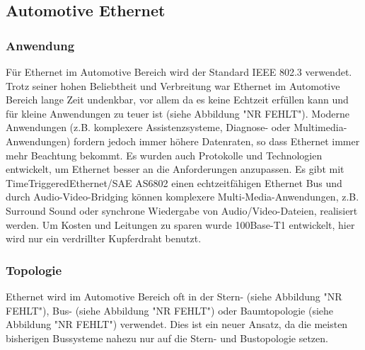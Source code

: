     \graphicspath{{./Images/Kapitel4/}}
    
    \subsection{Automotive Ethernet}
    \subsubsection{Anwendung}
    Für Ethernet im Automotive Bereich wird der Standard IEEE 802.3 verwendet. Trotz seiner hohen Beliebtheit und Verbreitung war Ethernet im Automotive Bereich lange Zeit undenkbar, vor allem da es keine Echtzeit erfüllen kann und für kleine Anwendungen zu teuer ist (siehe Abbildung "NR FEHLT"). Moderne Anwendungen (z.B. komplexere Assistenzsysteme, Diagnose- oder Multimedia-Anwendungen) fordern jedoch immer höhere Datenraten, so dass Ethernet immer mehr Beachtung bekommt. Es wurden auch Protokolle und Technologien entwickelt, um Ethernet besser an die Anforderungen anzupassen. Es gibt mit TimeTriggeredEthernet/SAE AS6802 einen echtzeitfähigen Ethernet Bus und durch Audio-Video-Bridging können komplexere Multi-Media-Anwendungen, z.B. Surround Sound oder synchrone Wiedergabe von Audio/Video-Dateien, realisiert werden. Um Kosten und Leitungen zu sparen wurde 100Base-T1 entwickelt, hier wird nur ein verdrillter Kupferdraht benutzt. \cite{.MH_Ethernet}
    
    \subsubsection{Topologie}
    Ethernet wird im Automotive Bereich oft in der Stern- (siehe Abbildung "NR FEHLT"), Bus- (siehe Abbildung "NR FEHLT") oder Baumtopologie (siehe Abbildung "NR FEHLT") verwendet. Dies ist ein neuer Ansatz, da die meisten bisherigen Bussysteme nahezu nur auf die Stern- und Bustopologie setzen.
    
    \cite{.MH_Vehicle}
    
